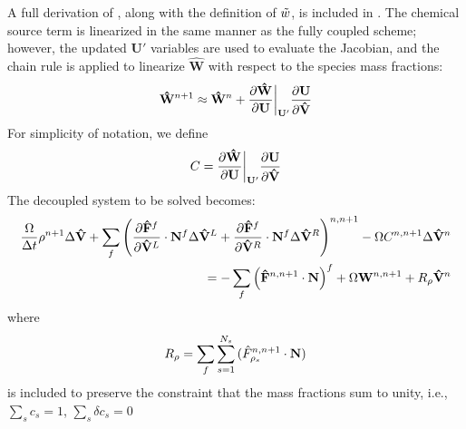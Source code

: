 A full derivation of , along with the definition of
$\tilde{w}$, is included in . The chemical source
term is linearized in the same manner as the fully coupled scheme; however, the
updated $\mathbf{U}'$ variables are used to evaluate the Jacobian, and the chain
rule is applied to linearize $\mathbf{\hat{W}}$ with respect to the species mass
fractions:
\begin{equation} 
  \mathbf{\hat{W}}^{n+1} \approx \mathbf{\hat{W}}^n + 
  \frac{\partial \mathbf{\hat{W}}}{\partial \mathbf U} \bigg|_{\mathbf U '} 
  \frac{\partial \mathbf U}{\partial \mathbf{\hat{V}}}
  \label{source-term-linearization}
\end{equation}
For simplicity of notation, we define
\begin{equation} 
  C = \frac{\partial \mathbf{\hat{W}}}{\partial \mathbf U} \bigg|_{\mathbf{U}'} \frac{\partial \mathbf U}{\partial \mathbf{\hat{V}}}
  \label{c-source-term}
\end{equation}
The decoupled system to be solved becomes:
\begin{equation} 
  \begin{split}
    \frac{\Omega}{\Delta t} \rho^{n+1} \Delta\mathbf{\hat{V}} + 
    \sum\limits_{f}^{}{ \left( 
      \frac{\partial \mathbf{\hat{F}}^f}{\partial \mathbf{\hat{V}}^L} \cdot \mathbf{N}^f \Delta \mathbf{\hat{V}}^L 
    + \frac{\partial \mathbf{\hat{F}}^f}{\partial \mathbf{\hat{V}}^R} \cdot \mathbf{N}^f \Delta \mathbf{\hat{V}}^R 
    \right)^{n,n+1}} 
    - \Omega C^{n,n+1} \Delta \mathbf{\hat{V}}^n \\ 
    = -\sum\limits_{f}^{}{
      \left( \mathbf{\hat{F}}^{n,n+1} \cdot \mathbf{N} \right)^f 
    } 
    + \Omega \mathbf W^{n, n+1} + R_\rho \mathbf{\hat{V}}^n
  \end{split}
  \label{decoupled-no-scaling}
\end{equation}
where
\begin{equation}
  R_\rho =
  \sum\limits_{f}^{}{\sum\limits_{s=1}^{N_s}{(\hat{F}_{\rho_s}^{n,n+1}\cdot\mathbf{N})}} 
  \label{dc-constraint}
\end{equation}
is included to preserve the constraint that the mass fractions
sum to unity, i.e., $\sum\limits_{s}{c_s}=1$, $\sum\limits_{s}{\delta c_s}=0$

